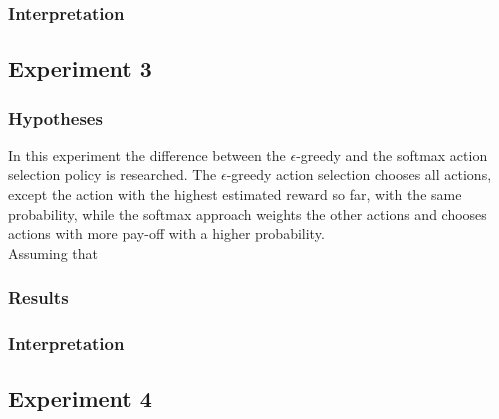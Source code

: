 \documentclass[11pt]{article}
\begin{document}
\subsubsection{Interpretation}


\subsubsection{}

\subsection{Experiment 3}

\subsubsection{Hypotheses}
In this experiment the difference between the $\epsilon$-greedy and the softmax action selection policy is researched. The $\epsilon$-greedy action selection chooses all actions, except the action with the highest estimated reward so far, with the same probability, while the softmax approach weights the other actions and chooses actions with more pay-off with a higher probability.\\
Assuming that 
\subsubsection{Results}


\subsubsection{Interpretation}


\subsubsection{}

\subsection{Experiment 4}
\end{document}
